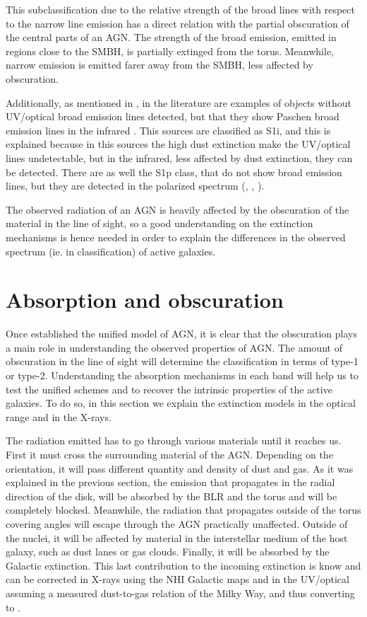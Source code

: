 This subclassification due to the relative strength of the broad lines with respect to the narrow line emission has a direct relation with the partial obscuration of the central parts of an AGN.  The strength of the broad emission, emitted in regions close to the SMBH, is partially extinged from the torus. Meanwhile, narrow emission is emitted farer away from the SMBH, less affected by obscuration.

Additionally, as mentioned in \cite{veroncetty06}, in the literature are examples of objects without UV/optical broad emission lines detected, but that they show Paschen broad emission lines in the infrared \citep{goodrich94}. This sources are classified as S1i, and this is explained because in this sources the high dust extinction make the UV/optical lines undetectable, but in the infrared, less affected by dust extinction, they can be detected. There are as well the S1p class, that do not show broad emission lines, but they are detected in the polarized spectrum (\citealt{antonucci85}, \citealt{miller90}, \citealt{tran92}).

The observed radiation of an AGN is heavily affected by the obscuration of the material in the line of sight, so a good understanding on the extinction mechanisms is hence needed in order to explain the differences in the observed spectrum (ie. in classification) of active galaxies.


\section{Absorption and obscuration}
\label{sec1:abs}


Once established the unified model of AGN, it is clear that the obscuration plays a main role in understanding the observed properties of AGN. The amount of obscuration in the line of sight will determine the classification in terms of type-1 or type-2. Understanding the absorption mechanisms in each band will help us to test the unified schemes and to recover the intrinsic properties of the active galaxies. To do so, in this section we explain the extinction models in the optical range and in the X-rays. 

The radiation emitted has to go through various materials until it reaches us. First it must cross the surrounding material of the AGN. Depending on the orientation, it will pass different quantity and density of dust and gas. As it was explained in the previous section, the emission that propagates in the radial direction of the disk, will be absorbed by the BLR and the torus and will be completely blocked. Meanwhile, the radiation that propagates outside of the torus covering angles will escape through the AGN practically unaffected. Outside of the nuclei, it will be affected by material in the interstellar medium of the host galaxy, such as dust lanes or gas clouds. Finally, it will be absorbed by the Galactic extinction. This last contribution to the incoming extinction is know and can be corrected in X-rays using the NHI Galactic maps \citep{dickey1990} and in the UV/optical assuming a measured dust-to-gas relation of the Milky Way, and thus converting \NH to \Av.

